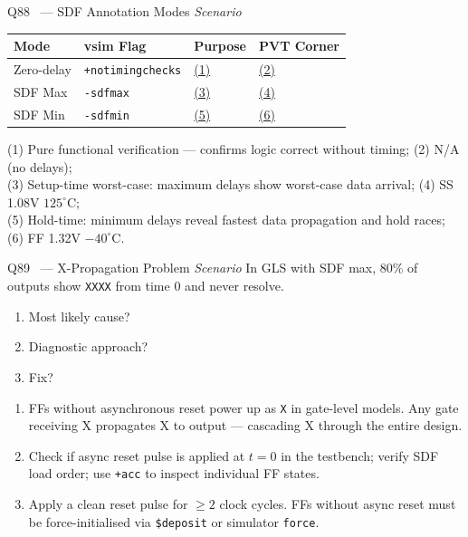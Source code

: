 \documentclass[12pt,a4paper]{article}
\newcommand{\advanced}{%
  \fbox{\textcolor{advred}{\bfseries\sffamily\small ADVANCED}}}
\begin{document}
\begin{questionbox}{Q88 \advanced\ --- SDF Annotation Modes \hfill\textit{Scenario}}

\begin{center}
\begin{tabular}{|l|l|l|l|}
\hline
\rowcolor{dkblue!15}
\textbf{Mode} & \textbf{vsim Flag} & \textbf{Purpose} & \textbf{PVT Corner}\\
\hline
Zero-delay & \texttt{+notimingchecks} & \underline{(1)} & \underline{(2)}\\
\hline
SDF Max & \texttt{-sdfmax} & \underline{(3)} & \underline{(4)}\\
\hline
SDF Min & \texttt{-sdfmin} & \underline{(5)} & \underline{(6)}\\
\hline
\end{tabular}
\end{center}
\end{questionbox}

\begin{answerbox}
(1) Pure functional verification --- confirms logic correct without timing; (2) N/A (no delays);\\
(3) Setup-time worst-case: maximum delays show worst-case data arrival; (4) SS 1.08V $125^\circ\text{C}$;\\
(5) Hold-time: minimum delays reveal fastest data propagation and hold races; (6) FF 1.32V $-40^\circ\text{C}$.
\end{answerbox}

\begin{questionbox}{Q89 \advanced\ --- X-Propagation Problem \hfill\textit{Scenario}}
In GLS with SDF max, 80\% of outputs show \texttt{XXXX} from time 0 and never resolve.
\begin{enumerate}[label=\textbf{\alph*)}]
  \item Most likely cause?
  \item Diagnostic approach?
  \item Fix?
\end{enumerate}
\end{questionbox}

\begin{answerbox}
\begin{enumerate}[label=\textbf{\alph*)}]
  \item FFs without asynchronous reset power up as \texttt{X} in gate-level models. Any gate receiving X propagates X to output --- cascading X through the entire design.
  \item Check if async reset pulse is applied at $t=0$ in the testbench; verify SDF load order; use \texttt{+acc} to inspect individual FF states.
  \item Apply a clean reset pulse for $\geq 2$ clock cycles. FFs without async reset must be force-initialised via \texttt{\$deposit} or simulator \texttt{force}.
\end{enumerate}
\end{answerbox}
\end{document}

